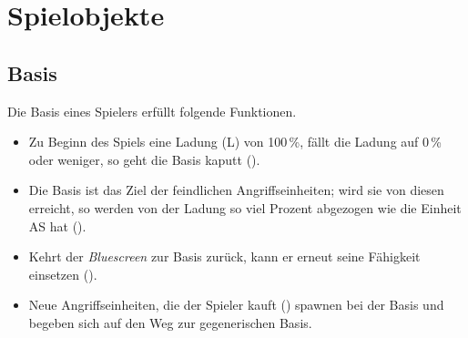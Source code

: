 \section{Spielobjekte}

%
%







\subsection{Basis}

Die Basis eines Spielers erfüllt folgende Funktionen.

\begin{itemize}
  \item Zu Beginn des Spiels eine Ladung (L) von 100\,\%, fällt die Ladung auf
    0\,\% oder weniger, so geht die Basis kaputt ().

  \item Die Basis ist das Ziel der feindlichen Angriffseinheiten; wird sie von
    diesen erreicht, so werden von der Ladung so viel Prozent abgezogen wie die
    Einheit AS hat ().

  \item Kehrt der \emph{Bluescreen} zur Basis zurück, kann er erneut seine
    Fähigkeit einsetzen ().

  \item Neue Angriffseinheiten, die der Spieler kauft ()
    spawnen bei der Basis und begeben sich auf den Weg zur gegenerischen Basis.

\end{itemize}
